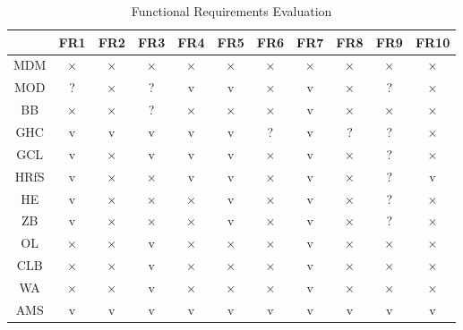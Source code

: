 \begin{table}[H]
    \centering
    \bgroup
    \def\arraystretch{1.5}
    \begin{tabular}{|c|c|c|c|c|c|c|c|c|c|c|}
    \hline
         & FR1 & FR2 & FR3 & FR4 & FR5 & FR6 & FR7 & FR8 & FR9 & FR10 \\ \hline
        MDM & × & × & × & × & × & × & × & × & × & × \\ \hline
        MOD & ? & × & ? & v & v & × & v & × & ? & × \\ \hline
        BB & × & × & ? & × & × & × & v & × & × & × \\ \hline
        GHC & v & v & v & v & v & ? & v & ? & ? & × \\ \hline
        GCL & v & × & v & v & v & × & v & × & ? & × \\ \hline
        HRfS & v & × & × & v & v & × & v & × & ? & v \\ \hline
        HE & v & × & × & × & v & × & v & × & ? & × \\ \hline
        ZB & v & × & × & × & v & × & v & × & ? & × \\ \hline
        OL & × & × & v & × & × & × & v & × & × & × \\ \hline
        CLB & × & × & v & × & × & × & v & × & × & × \\ \hline
        WA & × & × & v & × & × & × & v & × & × & × \\ \hline
        AMS & v & v & v & v & v & v & v & v & v & v \\ \hline
    \end{tabular}
    \egroup
    \caption{Functional Requirements Evaluation}
\end{table}
